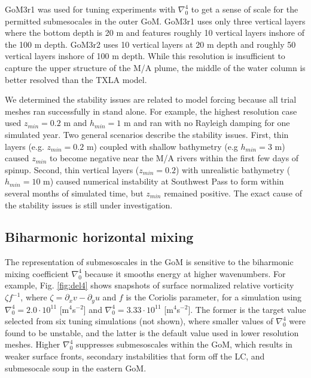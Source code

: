 GoM3r1 was used for tuning experiments with $\nabla_0^4$ to get a sense of scale for the permitted submesocales in the outer GoM. GoM3r1 uses only three vertical layers where the bottom depth is 20 m and features roughly 10 vertical layers inshore of the 100 m depth. GoM3r2 uses 10 vertical layers at 20 m depth and roughly 50 vertical layers inshore of 100 m depth. While this resolution is insufficient to capture the upper structure of the M/A plume, the middle of the water column is better resolved than the TXLA model.

We determined the stability issues are related to model forcing because all trial meshes ran successfully in stand alone. For example, the highest resolution case used $z_{min} = 0.2$ m and $h_{min} = 1$ m and ran with no Rayleigh damping for one simulated year. Two general scenarios describe the stability issues. First, thin layers (e.g. $z_{min} = 0.2$ m) coupled with shallow bathymetry (e.g $h_{min}=3$ m) caused $z_{min}$ to become negative near the M/A rivers within the first few days of spinup. Second, thin vertical layers ($z_{min} = 0.2$) with unrealistic bathymetry ($h_{min}=10$ m) caused numerical instability at Southwest Pass to form within several months of simulated time, but $z_{min}$ remained positive. The exact cause of the stability issues is still under investigation. 

\subsection{Biharmonic horizontal mixing}
The representation of submesoscales in the GoM is sensitive to the biharmonic mixing coefficient $\nabla_0^4$ because it smooths energy at higher wavenumbers. For example, Fig. \ref{fig:del4} shows snapshots of surface normalized relative vorticity $\zeta f^{-1}$, where $\zeta = \partial_x v - \partial_y u$ and $f$ is the Coriolis parameter, for a simulation using $\nabla_0^4=2.0 \cdot 10^{11}$ [m$^4$s$^{-2}$] and $\nabla_0^4=3.33 \cdot 10^{11}$ [m$^4$s$^{-2}$]. The former is the target value selected from six tuning simulations (not shown), where smaller values of $\nabla_0^4$ were found to be unstable, and the latter is the default value used in lower resolution meshes. Higher $\nabla_0^4$ suppresses submesoscales within the GoM, which results in weaker surface fronts, secondary instabilities that form off the LC, and submesocale soup in the eastern GoM. 

